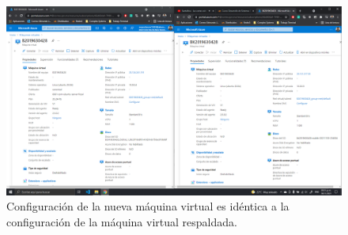 \documentclass[11pt]{article}
\begin{document}
		\begin{figure}[H]
			\centering
			\includegraphics[scale=0.34]{resources/3.F.png}
			\caption{Configuración de la nueva máquina virtual es idéntica a la configuración de la máquina virtual respaldada.}\label{fig:picture}
		\end{figure}
\end{document}
